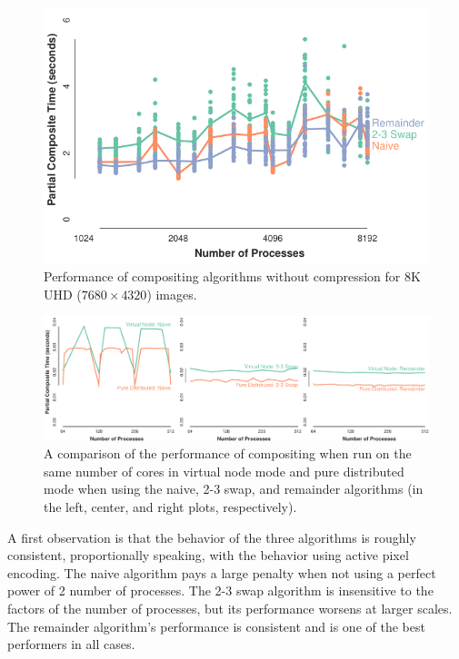 \documentclass{vgtc}                          %
\newcommand{\textalgorithm}[1]{\textsf{#1}\xspace}
\newcommand{\ttswap}{\textalgorithm{2-3 swap}}
\newcommand{\naive}{\textalgorithm{naive}}
\newcommand{\remainder}{\textalgorithm{remainder}}
\begin{document}
\begin{figure}
  \centering
  \includegraphics[width=\linewidth]{no-compress-8k}
  \caption{
    Performance of compositing algorithms without compression for 8K UHD ($7680 \times 4320$) images.
  }
  \label{fig:NoCompress8K}
\end{figure}

\begin{figure}
  \centering
  \includegraphics[width=\linewidth]{vn-vs-smp-hdtv}
  \caption{
    A comparison of the performance of compositing when run on the same number of cores in virtual node mode and pure distributed mode when using the \naive, \ttswap, and \remainder algorithms (in the left, center, and right plots, respectively).
  }
  \label{fig:VNvsSMPHDTV}
\end{figure}

A first observation is that the behavior of the three algorithms is roughly consistent, proportionally speaking, with the behavior using active pixel encoding.
The \naive algorithm pays a large penalty when not using a perfect power of 2 number of processes.
The \ttswap algorithm is insensitive to the factors of the number of processes, but its performance worsens at larger scales.
The \remainder algorithm's performance is consistent and is one of the best performers in all cases.
\end{document}
